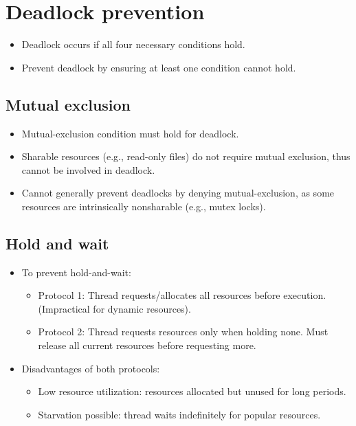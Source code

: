\section{Deadlock prevention}

\begin{itemize}[noitemsep, topsep=0pt]
    \item Deadlock occurs if all four necessary conditions hold.
    \item Prevent deadlock by ensuring at least one condition cannot hold.
\end{itemize}

\subsection*{Mutual exclusion}
\begin{itemize}[noitemsep, topsep=0pt]
    \item Mutual-exclusion condition must hold for deadlock.
    \item Sharable resources (e.g., read-only files) do not require mutual exclusion, thus cannot be involved in deadlock.
    \item Cannot generally prevent deadlocks by denying mutual-exclusion, as some resources are intrinsically nonsharable (e.g., mutex locks).
\end{itemize}

\subsection*{Hold and wait}
\begin{itemize}[noitemsep, topsep=0pt]
    \item To prevent hold-and-wait:
    \begin{itemize}[noitemsep, topsep=0pt]
        \item Protocol 1: Thread requests/allocates all resources before execution. (Impractical for dynamic resources).
        \item Protocol 2: Thread requests resources only when holding none. Must release all current resources before requesting more.
    \end{itemize}
    \item Disadvantages of both protocols:
    \begin{itemize}[noitemsep, topsep=0pt]
        \item Low resource utilization: resources allocated but unused for long periods.
        \item Starvation possible: thread waits indefinitely for popular resources.
    \end{itemize}
\end{itemize}


